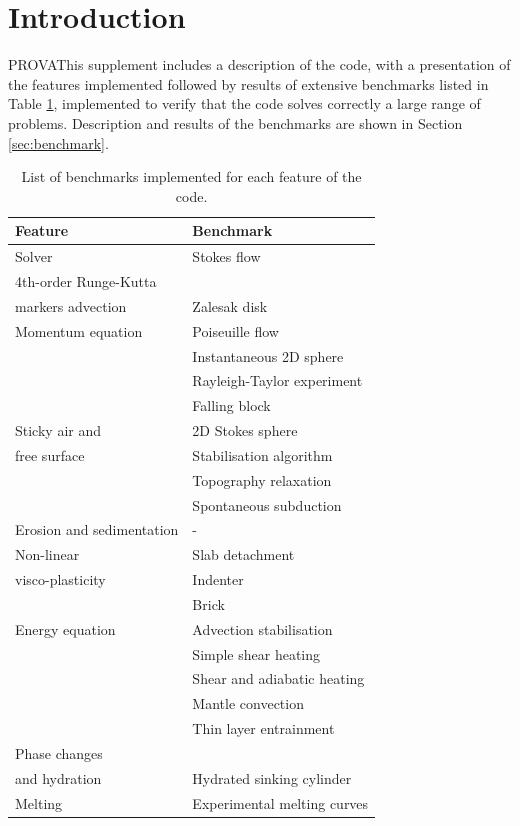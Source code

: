 \documentclass[hidelinks,11pt,a4paper]{article}
\begin{document}
\section{Introduction}\label{sec:intro}
PROVAThis supplement includes a description of the code, with a presentation of the features implemented followed by results of extensive benchmarks listed in Table \ref{tab:list}, implemented to verify that the code solves correctly a large range of problems. Description and results of the benchmarks are shown in Section \ref{sec:benchmark}.

\begin{table}[H]
\caption{List of benchmarks implemented for each feature of the code.}
\centering
\begin{tabular}{| l | l |}
\hline
 \textbf{Feature}  & \textbf{Benchmark}  \\
\hline
\hline
  Solver  & Stokes flow   \\
\hline
  4th-order Runge-Kutta  &  \\
  markers advection  & Zalesak disk   \\
\hline
  Momentum equation  & Poiseuille flow   \\
    & Instantaneous 2D sphere   \\
    & Rayleigh-Taylor experiment  \\
    & Falling block  \\
\hline
  Sticky air and  & 2D Stokes sphere \\
  free surface  & Stabilisation algorithm   \\
  & Topography relaxation   \\
  & Spontaneous subduction   \\
\hline
  Erosion and sedimentation  & -  \\
\hline
   Non-linear  & Slab detachment   \\
   visco-plasticity & Indenter   \\
    & Brick   \\
\hline
  Energy equation  & Advection stabilisation   \\
    & Simple shear heating \\
    & Shear and adiabatic heating \\
    & Mantle convection   \\
    & Thin layer entrainment   \\
\hline
  Phase changes  &  \\
  and hydration  & Hydrated sinking cylinder   \\
\hline
  Melting & Experimental melting curves \\
\hline
\end{tabular}
\label{tab:list}
\end{table}
\end{document}
